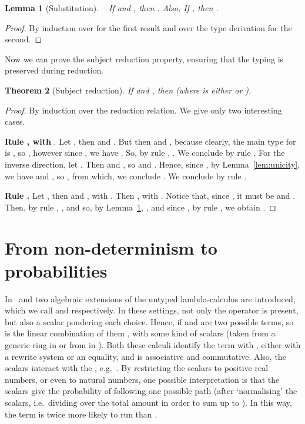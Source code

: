 \documentclass[final,copyright,creativecommons]{eptcs}
\newtheorem{theorem}{Theorem}[section]
\newtheorem{lemma}[theorem]{Lemma}
\theoremstyle{definition}
\begin{document}
\begin{lemma}[Substitution]\label{lem:substitution}~
 If  and , then . Also,
 If , then .
\end{lemma}
\begin{proof} By induction over  for the first result and over the type derivation for the second.
\end{proof}

\noindent Now we can prove the subject reduction property, ensuring that the typing is preserved during reduction.

\begin{theorem}[Subject reduction]\label{thm:SR}
 If  and , then \quad (where  is either  or ).
\end{theorem}
\begin{proof}
 By induction over the reduction relation. We give only two interesting cases.

\noindent\textbf{Rule  , with }. Let , then  and . But then  and , because clearly, the main type for  is , so , however since , we have . So, by rule , . We conclude by rule .
For the inverse direction, let . Then  and , so  and . Hence, since , by Lemma~\ref{lem:unicity}, we have  and , so , from which, we conclude . We conclude by rule .

\noindent\textbf{Rule .} Let , then  and , with . Then , with . Notice that, since , it must be  and . Then, by rule , , and so, by Lemma~\ref{lem:substitution}, , and since , by rule , we obtain .
\qedhere
\end{proof}

\section{From non-determinism to probabilities}\label{sec:prob}
In~\cite{ArrighiDowekRTA08} and \cite{VauxMSCS09} two algebraic extensions of the untyped lambda-calculus are introduced, which we call  and  respectively. In these settings, not only the  operator is present, but also a scalar pondering each choice. Hence, if  and  are two possible terms, so is the linear combination of them , with  some kind of scalars (taken from a generic ring in  or from  in ). Both these calculi identify the term  with , either with a rewrite system or an equality, and  is associative and commutative. Also, the scalars interact with the , e.g.~. By restricting the scalars to positive real numbers,
or even to natural numbers, one possible interpretation is that the scalars give the probability of following one possible path (after `normalising' the scalars, i.e.~dividing over the total amount in order to sum up to ).
In this way, the term  is twice more likely to run  than .
\end{document}
